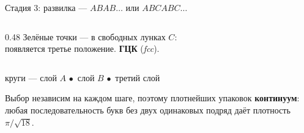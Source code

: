 \documentclass[aspectratio=169,10pt]{beamer}
\begin{document}
\begin{frame}{Стадия 3: развилка — $ABAB\ldots$ или $ABCABC\ldots$}
\begin{columns}[T,onlytextwidth]
\begin{column}{0.48\textwidth}
\vspace{2pt}
{\scriptsize\color{cMuted} Зелёные точки — в свободных лунках $C$:\\ появляется третье положение. \textbf{ГЦК} (\emph{fcc}).}
\end{column}
\end{columns}

\vspace{0.3em}
\centering
{\scriptsize\color{cMuted} круги — слой $A$\quad
\textcolor{cLayB!80!black}{$\bullet$}~слой $B$\quad
\textcolor{cProved}{$\bullet$}~третий слой}

\vspace{0.5em}
\raggedright
{\footnotesize Выбор независим на каждом шаге, поэтому плотнейших упаковок \textbf{континуум}: любая последовательность букв без двух одинаковых подряд даёт плотность $\pi/\sqrt{18}$.}
\end{frame}
\end{document}
